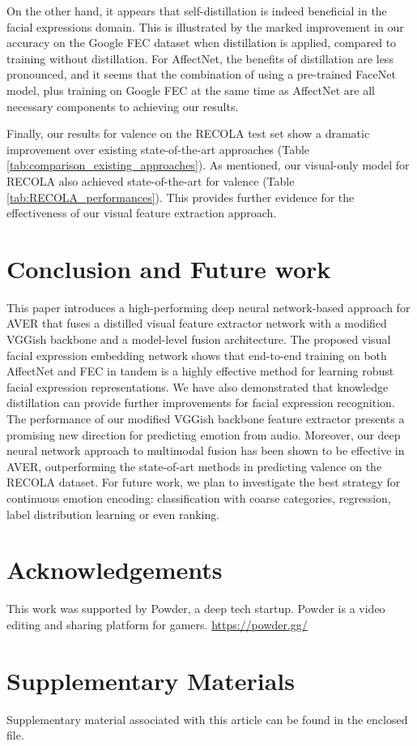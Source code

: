 \documentclass[times,twocolumn,final,authoryear]{elsarticle}
\begin{document}
	On the other hand, it appears that self-distillation is indeed beneficial in the facial expressions domain. This is illustrated by the marked improvement in our accuracy on the Google FEC dataset when distillation is applied, compared to training without distillation. For AffectNet, the benefits of distillation are less pronounced, and it seems that the combination of using a pre-trained FaceNet model, plus training on Google FEC at the same time as AffectNet are all necessary components to achieving our results. 
	
	Finally, our results for valence on the RECOLA test set show a dramatic improvement over existing state-of-the-art approaches (Table \ref{tab:comparison_existing_approaches}). As mentioned, our visual-only model for RECOLA also achieved state-of-the-art for valence (Table \ref{tab:RECOLA_performances}). This provides further evidence for the effectiveness of our visual feature extraction approach.
	
	\section{Conclusion and Future work}
	\label{sec:conclusion}
	This paper introduces a high-performing deep neural network-based approach for AVER that fuses a distilled visual feature extractor network with a modified VGGish backbone and a model-level fusion architecture. The proposed visual facial expression embedding network shows that end-to-end training on both AffectNet and FEC in tandem is a highly effective method for learning robust facial expression representations. We have also demonstrated that knowledge distillation can provide further improvements for facial expression recognition. The performance of our modified VGGish backbone feature extractor presents a promising new direction for predicting emotion from audio. Moreover, our deep neural network approach to multimodal fusion has been shown to be effective in AVER, outperforming the state-of-art methods in predicting valence on the RECOLA dataset. For future work, we plan to investigate the best strategy for continuous emotion encoding: classification with coarse categories, regression, label distribution learning or even ranking.
	
	\section*{Acknowledgements}
	This work was supported by Powder, a deep tech startup. Powder is a video editing and sharing platform for gamers. \url{https://powder.gg/}
	
	\section*{Supplementary Materials}
	\label{sec:supp}
	
	Supplementary material associated with this article can be found in the enclosed file.
	
	

	
	
\end{document}
